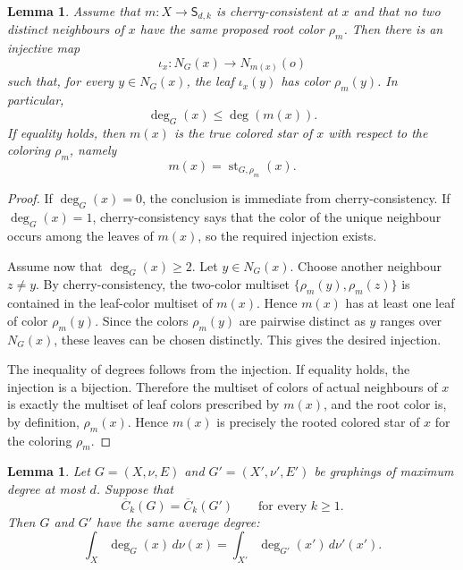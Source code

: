 \documentclass[11pt]{amsart}
\newtheorem{lemma}[theorem]{Lemma}
\theoremstyle{remark}
\begin{document}
\begin{lemma}\label{lem:cherry-consistency-injection}
Assume that $m\colon X\to\mathsf S_{d,k}$ is cherry-consistent at $x$ and that no two distinct neighbours of $x$ have the same proposed root color $\rho_m$. Then there is an injective map
\[
 \iota_x\colon N_G(x)\to N_{m(x)}(o)
\]
such that, for every $y\in N_G(x)$, the leaf $\iota_x(y)$ has color $\rho_m(y)$. In particular,
\[
 \deg_G(x)\leq \deg(m(x)).
\]
If equality holds, then $m(x)$ is the true colored star of $x$ with respect to the coloring $\rho_m$, namely
\[
 m(x)=\operatorname{st}_{G,\rho_m}(x).
\]
\end{lemma}

\begin{proof}
If $\deg_G(x)=0$, the conclusion is immediate from cherry-consistency. If $\deg_G(x)=1$, cherry-consistency says that the color of the unique neighbour occurs among the leaves of $m(x)$, so the required injection exists.

Assume now that $\deg_G(x)\geq 2$. Let $y\in N_G(x)$. Choose another neighbour $z\neq y$. By cherry-consistency, the two-color multiset $\{\rho_m(y),\rho_m(z)\}$ is contained in the leaf-color multiset of $m(x)$. Hence $m(x)$ has at least one leaf of color $\rho_m(y)$. Since the colors $\rho_m(y)$ are pairwise distinct as $y$ ranges over $N_G(x)$, these leaves can be chosen distinctly. This gives the desired injection.

The inequality of degrees follows from the injection. If equality holds, the injection is a bijection. Therefore the multiset of colors of actual neighbours of $x$ is exactly the multiset of leaf colors prescribed by $m(x)$, and the root color is, by definition, $\rho_m(x)$. Hence $m(x)$ is precisely the rooted colored star of $x$ for the coloring $\rho_m$.
\end{proof}

\begin{lemma}\label{lem:degree-inequality-from-cherries}
Let $G=(X,\nu,E)$ and $G'=(X',\nu',E')$ be graphings of maximum degree at most $d$. Suppose that
\[
 \overline C_k(G)=\overline C_k(G')
 \qquad\text{for every }k\geq 1.
\]
Then $G$ and $G'$ have the same average degree:
\[
 \int_X \deg_G(x)\,d\nu(x)=\int_{X'}\deg_{G'}(x')\,d\nu'(x').
\]
\end{lemma}
\end{document}
